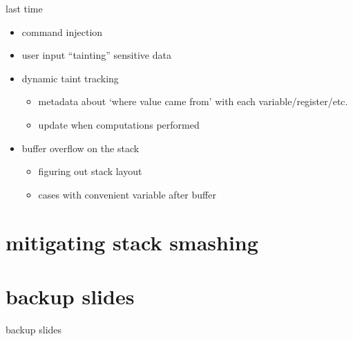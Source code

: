 \date{}
\title{}
\date{}

\begin{frame}
    \titlepage
\end{frame}



\begin{frame}{last time}
    \begin{itemize}
    \item command injection
    \item user input ``tainting'' sensitive data
    \item dynamic taint tracking
        \begin{itemize}
        \item metadata about `where value came from' with each variable/register/etc.
        \item update when computations performed
        \end{itemize}
    \item buffer overflow on the stack
        \begin{itemize}
        \item figuring out stack layout
        \item cases with convenient variable after buffer
        \end{itemize}
    \end{itemize}
\end{frame}





\section{mitigating stack smashing}






\section{backup slides}
\begin{frame}{backup slides}
\end{frame}






